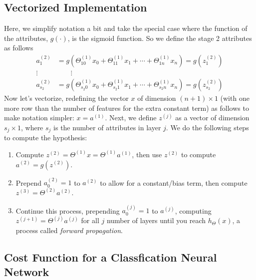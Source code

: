 \documentclass[12pt]{article}
\begin{document}
\newpage
\subsection{Vectorized Implementation}

Here, we simplify notation a bit and take the special case where the
function of the attributes, $g(\cdot)$, is the sigmoid
function. So we define the stage 2 attributes as follows
\begin{align*}
    a_1^{(2)} &= g\left(\Theta_{10}^{(1)} x_0
	+ \Theta_{11}^{(1)} x_1 + \cdots
	+ \Theta_{1n}^{(1)} x_n\right) = g\left(z_1^{(2)}\right)
    \\
    \vdots \quad & \qquad \vdots\\
    a_{s_2}^{(2)} &= g\left(\Theta_{s_2 0}^{(1)} x_0
	+ \Theta_{s_2 1}^{(1)} x_1 + \cdots
	+ \Theta_{s_2 n}^{(1)} x_n\right)
	= g\left(z_{s_2}^{(2)}\right)
\end{align*}
Now let's vectorize, redefining the vector $x$ of dimension
$(n+1)\times1$ (with one more row than the number of features for the
extra constant term) as follows to make notation
simpler: $x = a^{(1)}$. Next, we define $z^{(j)}$ as a vector of
dimension $s_j \times 1$, where $s_j$ is the number of attributes in
layer $j$. We do the following steps to compute the hypothesis:
\begin{enumerate}
    \item Compute $z^{(2)} = \Theta^{(1)} x = \Theta^{(1)} a^{(1)}$,
	then use $z^{(2)}$ to compute $a^{(2)} = g(z^{(2)})$.
    \item Prepend $a_0^{(2)}=1$ to $a^{(2)}$ to allow for a
	constant/bias term, then compute $z^{(3)} = \Theta^{(2)}a^{(2)}$.
    \item Continue this process, prepending $a_0^{(j)}=1$ to
	$a^{(j)}$, computing $z^{(j+1)} = \Theta^{(j)} a^{(j)}$ for
	all $j$ number of layers until you reach $h_\Theta(x)$, a
	process called \emph{forward propagation}.
\end{enumerate}


\subsection{Cost Function for a Classfication Neural Network}
\end{document}
